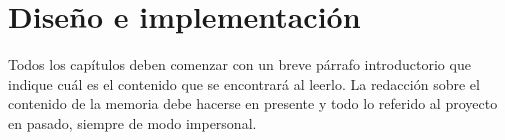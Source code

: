 \chapter{Diseño e implementación} %

\label{Chapter3} %

Todos los capítulos deben comenzar con un breve párrafo introductorio que indique cuál es el contenido que se encontrará al leerlo.  La redacción sobre el contenido de la memoria debe hacerse en presente y todo lo referido al proyecto en pasado, siempre de modo impersonal.


